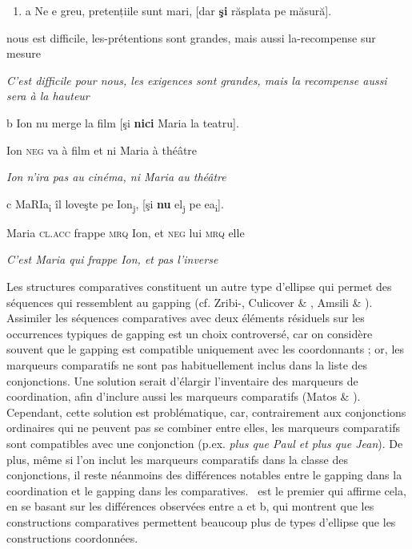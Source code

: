 \begin{enumerate}
\item a  Ne e greu, pretențiile sunt mari, [dar \textbf{şi} răsplata pe măsură].


\end{enumerate}
nous est difficile, les-prétentions sont grandes, mais aussi la-recompense sur mesure 

{\itshape
C'est difficile pour nous, les exigences sont grandes, mais la recompense aussi sera à la hauteur      } 

  b  Ion nu merge la film [şi \textbf{nici} Maria la teatru].

Ion \textsc{neg} va à film et ni Maria à théâtre

{\itshape
Ion n'ira pas au cinéma, ni Maria au théâtre}

  c  MaRIa\textsubscript{i} îl     loveşte pe  Ion\textsubscript{j}, [şi \textbf{nu}  el\textsubscript{j} pe  ea\textsubscript{i}].

Maria \textsc{cl.acc} frappe  \textsc{mrq} Ion, et \textsc{neg} lui \textsc{mrq} elle 

{\itshape
  C'est Maria qui frappe Ion, et pas l'inverse     } 

Les structures comparatives constituent un autre type d'ellipse qui permet des séquences qui ressemblent au gapping (cf. Zribi-\citet{Hertz1986}, Culicover \& \citet{Jackendoff2005}, Amsili \& \citet{Desmets2008}). Assimiler les séquences comparatives avec deux éléments résiduels sur les occurrences typiques de gapping est un choix controversé, car on considère souvent que le gapping est compatible uniquement avec les coordonnants ; or, les marqueurs comparatifs ne sont pas habituellement inclus dans la liste des conjonctions. Une solution serait d'élargir l'inventaire des marqueurs de coordination, afin d'inclure aussi les marqueurs comparatifs (Matos \& \citet{Brito2008}). Cependant, cette solution est problématique, car, contrairement aux conjonctions ordinaires qui ne peuvent pas se combiner entre elles, les marqueurs comparatifs sont compatibles avec une conjonction (p.ex. \textit{plus que Paul et plus que Jean}). De plus, même si l'on inclut les marqueurs comparatifs dans la classe des conjonctions, il reste néanmoins des différences notables entre le gapping dans la coordination et le gapping dans les comparatives. \citet{Jackendoff1971}~est le premier qui affirme cela, en se basant sur les différences observées entre a et b, qui montrent que les constructions comparatives permettent beaucoup plus de types d'ellipse que les constructions coordonnées.


